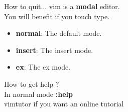 \documentclass{beamer}
\begin{document}
\begin{frame}{How to quit...}
	vim is a \textbf{modal} editor. \\ 
	\pause
	You will benefit if you touch type.\\ 
	\pause
	\begin{itemize}
		\item {
				\textbf{normal}: The default mode.
				\pause
				}
			\item {   
				\textbf{insert}: The insert mode.
				\pause
			}
		\item {
				\textbf{ex}: The ex mode.
				\pause
			}
	\end{itemize}
	How to get \alert{help }?\\ 
	\pause
	In normal mode \textbf{:help}\\
	\alert{vimtutor} if you want an online tutorial
\end{frame}
\end{document}
